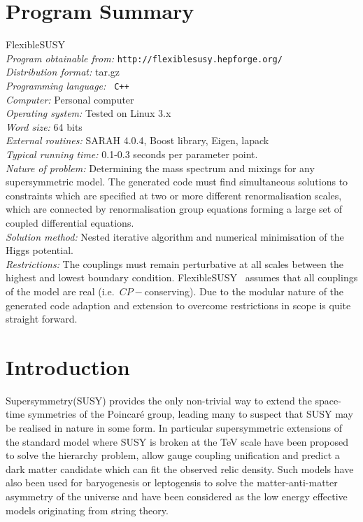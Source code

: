 \documentclass[final,3p,11pt,pdflatex]{elsarticle}
\newcommand{\fs}{FlexibleSUSY\xspace}
\begin{document}
\section{Program Summary}
 \fs\\ {\em Program obtainable from:}
         {\tt http://flexiblesusy.hepforge.org/}\\ {\em Distribution
           format:}\/ tar.gz\\ {\em Programming language:} {\tt
           C++}\\ {\em Computer:}\/ Personal computer\\ {\em Operating
           system:}\/ Tested on Linux 3.x\\ {\em Word size:}\/ 64
         bits\\ {\em External routines:}\/ SARAH 4.0.4, Boost library,
         Eigen, lapack\\ {\em
           Typical running time:}\/ 0.1-0.3 seconds per parameter
         point.\\ {\em Nature of problem:}\/ Determining the mass
         spectrum and mixings for any supersymmetric model. The
         generated code must find simultaneous solutions to
         constraints which are specified at two or more different
         renormalisation scales, which are connected by
         renormalisation group equations forming a large set of
         coupled differential equations. \\ {\em Solution method:}\/
         Nested iterative algorithm and numerical minimisation of the
         Higgs potential.  \\ {\em Restrictions:} The couplings must
         remain perturbative at all scales between the highest and
         lowest boundary condition.  \fs~ assumes that all couplings
         of the model are real (i.e.\ $CP-$conserving). Due to the
         modular nature of the generated code adaption and extension
         to overcome restrictions in scope is quite straight forward.





\newpage
\section{Introduction}
Supersymmetry(SUSY) provides the only non-trivial way to extend the
space-time symmetries of the Poincar\'e
group\cite{Coleman:1967ad,Haag:1974qh}, leading many to suspect that
SUSY may be realised in nature in some form. In particular
supersymmetric extensions of the standard model where SUSY is broken
at the TeV scale have been proposed to solve the hierarchy
problem\cite{Weinberg:1975gm, Weinberg:1979bn, Gildener:1976ai,
  Susskind:1978ms, 'tHooft:1980xb}, allow gauge coupling
unification\cite{Langacker:1990jh, Ellis:1990wk, Amaldi:1991cn,
  Langacker:1991an, Giunti:1991ta} and predict a dark matter candidate
which can fit the observed relic
density\cite{Goldberg:1983nd,Ellis:1983ew}.  Such models have also
been used for baryogenesis or leptogensis to solve the
matter-anti-matter asymmetry of the universe and have been considered
as the low energy effective models originating from string
theory.
\end{document}
